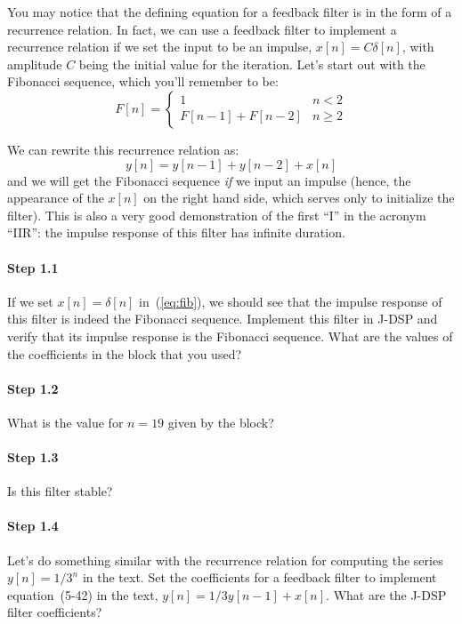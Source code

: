 You may notice that the defining equation for a feedback filter is in
the form of a recurrence relation. In fact, we can use a feedback
filter to implement a recurrence relation if we set the input to be
an impulse, $x[n] = C \delta[n]$, with amplitude $C$ being the initial
value for the iteration. Let's start out with the Fibonacci sequence,
which you'll remember to be:
\begin{equation}
  F[n] = \left\{ \begin{array}{ll}
      1 & n < 2 \\
      F[n-1] + F[n-2] & n \geq 2
    \end{array} \right.
\end{equation}

We can rewrite this recurrence relation as:
\begin{equation}
  y[n] = y[n-1] + y[n-2] + x[n]
  \label{eq:fib}
\end{equation}
and we will get the Fibonacci sequence \emph{if} we input an impulse
(hence, the appearance of the $x[n]$ on the right hand side, which
serves only to initialize the filter). This is also a very good
demonstration of the first ``I'' in the acronym ``IIR'': the impulse
response of this filter has infinite duration.

\paragraph{Step 1.1} If we set $x[n]=\delta[n]$ in~(\ref{eq:fib}), we
should see that the impulse response of this filter is indeed the
Fibonacci sequence. Implement this filter in J-DSP and verify that its
impulse response is the Fibonacci sequence. What are the values of the
coefficients in the  block that you used?


\paragraph{Step 1.2} What is the value for $n=19$ given by the
 block?


\paragraph{Step 1.3} Is this filter stable?


\paragraph{Step 1.4} Let's do something similar with the recurrence
relation for computing the series $y[n] = 1/3^n$ in the text. Set the
coefficients for a feedback filter to implement equation~(5-42) in the
text, $y[n] = 1/3 y[n-1] + x[n]$. What are the J-DSP filter coefficients?


